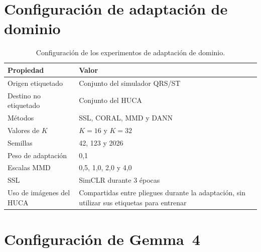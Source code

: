 \clearpage
\section{Configuración de adaptación de dominio}

\begin{table}[H]
  \centering
  \small
  \begin{tabularx}{0.94\textwidth}{p{4.4cm}X}
    \toprule
    Propiedad & Valor \\
    \midrule
    Origen etiquetado & Conjunto del simulador QRS/ST \\
    Destino no etiquetado & Conjunto del HUCA \\
    Métodos & SSL, CORAL, MMD y DANN \cite{chen2020simclr,sun2016deepcoral,long2015dan,ganin2016} \\
    Valores de \(K\) & \(K=16\) y \(K=32\) \\
    Semillas & 42, 123 y 2026 \\
    Peso de adaptación & 0,1 \\
    Escalas MMD & 0,5, 1,0, 2,0 y 4,0 \\
    SSL & SimCLR durante 3 épocas \\
    Uso de imágenes del HUCA & Compartidas entre pliegues durante la adaptación, sin utilizar sus etiquetas para entrenar \\
    \bottomrule
  \end{tabularx}
  \caption{Configuración de los experimentos de adaptación de dominio.}
  \label{tab:config_domain_appendix}
  \label{tab:cnn_domain_methods}
\end{table}

\section{Configuración de Gemma~4}

